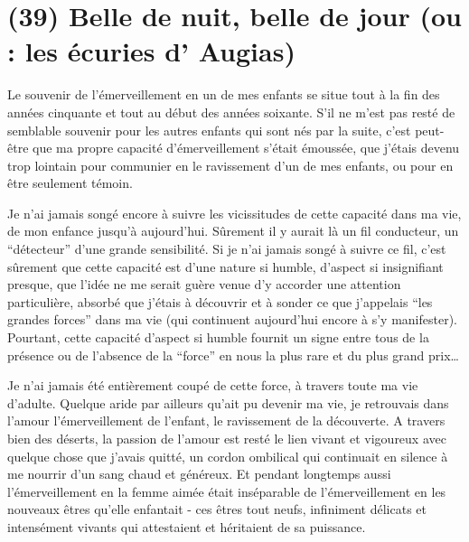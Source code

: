\section{(39) Belle de nuit, belle de jour (ou : les écuries d' Augias)}

Le souvenir de l'émerveillement en un de mes enfants se situe tout à la fin des années cinquante et tout au début des années soixante. S'il ne m'est pas resté de semblable souvenir pour les autres enfants qui sont nés par la suite, c'est peut-être que ma propre capacité d'émerveillement s'était émoussée, que j'étais devenu trop lointain pour communier en le ravissement d'un de mes enfants, ou pour en être seulement témoin.

Je n'ai jamais songé encore à suivre les vicissitudes de cette capacité dans ma vie, de mon enfance jusqu'à aujourd'hui. Sûrement il y aurait là un fil conducteur, un ``détecteur'' d'une grande sensibilité. Si je n'ai jamais songé à suivre ce fil, c'est sûrement que cette capacité est d'une nature si humble, d'aspect si insignifiant presque, que l'idée ne me serait guère venue d'y accorder une attention particulière, absorbé que j'étais à découvrir et à sonder ce que j'appelais ``les grandes forces'' dans ma vie (qui continuent aujourd'hui encore à s'y manifester). Pourtant, cette capacité d'aspect si humble fournit un signe entre tous de la présence ou de l'absence de la ``force'' en nous la plus rare et du plus grand prix\ldots

Je n'ai jamais été entièrement coupé de cette force, à travers toute ma vie d'adulte. Quelque aride par ailleurs qu'ait pu devenir ma vie, je retrouvais dans l'amour l'émerveillement de l'enfant, le ravissement de la découverte. A travers bien des déserts, la passion de l'amour est resté le lien vivant et vigoureux avec quelque chose que j'avais quitté, un cordon ombilical qui continuait en silence à me nourrir d'un sang chaud et généreux. Et pendant longtemps aussi l'émerveillement en la femme aimée était inséparable de l'émerveillement en les nouveaux êtres qu'elle enfantait - ces êtres tout neufs, infiniment délicats et intensément vivants qui attestaient et héritaient de sa puissance.

